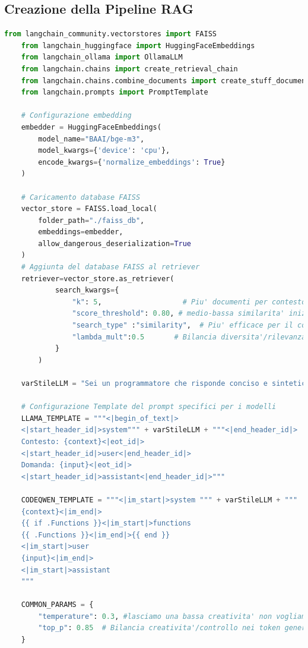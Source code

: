 \documentclass[12pt,a4paper,openright,twoside]{book}
\begin{document}
\subsection{Creazione della Pipeline RAG}
\begin{lstlisting}[language=Python, caption={Pipeline RAG}, label={lst:rag}]
    from langchain_community.vectorstores import FAISS
    from langchain_huggingface import HuggingFaceEmbeddings
    from langchain_ollama import OllamaLLM
    from langchain.chains import create_retrieval_chain
    from langchain.chains.combine_documents import create_stuff_documents_chain
    from langchain.prompts import PromptTemplate
    
    # Configurazione embedding
    embedder = HuggingFaceEmbeddings(
        model_name="BAAI/bge-m3",
        model_kwargs={'device': 'cpu'},
        encode_kwargs={'normalize_embeddings': True}
    )
    
    # Caricamento database FAISS
    vector_store = FAISS.load_local(
        folder_path="./faiss_db",
        embeddings=embedder,
        allow_dangerous_deserialization=True
    )
    # Aggiunta del database FAISS al retriever
    retriever=vector_store.as_retriever(
            search_kwargs={
                "k": 5,                   # Piu' documenti per contesto
                "score_threshold": 0.80, # medio-bassa similarita' inizialmente era 0.90
                "search_type" :"similarity",  # Piu' efficace per il codice
                "lambda_mult":0.5       # Bilancia diversita'/rilevanza
            }
        )
    
    varStileLLM = "Sei un programmatore che risponde conciso e sintetico."
    
    # Configurazione Template del prompt specifici per i modelli
    LLAMA_TEMPLATE = """<|begin_of_text|>
    <|start_header_id|>system""" + varStileLLM + """<|end_header_id|>
    Contesto: {context}<|eot_id|>
    <|start_header_id|>user<|end_header_id|>
    Domanda: {input}<|eot_id|>
    <|start_header_id|>assistant<|end_header_id|>"""
    
    CODEQWEN_TEMPLATE = """<|im_start|>system """ + varStileLLM + """
    {context}<|im_end|>
    {{ if .Functions }}<|im_start|>functions
    {{ .Functions }}<|im_end|>{{ end }}
    <|im_start|>user
    {input}<|im_end|>
    <|im_start|>assistant
    """
    
    COMMON_PARAMS = {
        "temperature": 0.3, #lasciamo una bassa creativita' non vogliamo che inventi risposte
        "top_p": 0.85  # Bilancia creativita'/controllo nei token generati
    }
    

\end{lstlisting}
\end{document}
